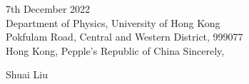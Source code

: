 \documentclass[11pt,a4paper,sans]{letter} %
\begin{document}
\begin{letter}{7th December 2022 \\
Department of Physics, University of Hong Kong\\
Pokfulam Road, Central and Western District, 999077\\ 
Hong Kong, Pepple's Republic of China}
Sincerely,

Shuai Liu




\end{letter}
\end{document}
